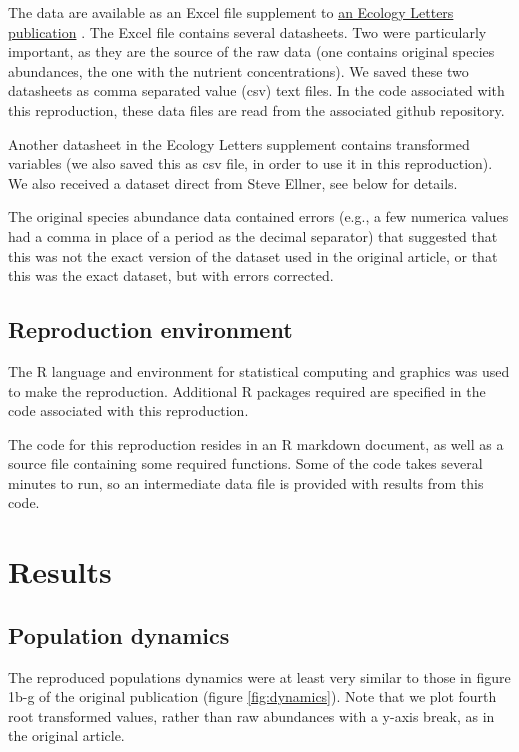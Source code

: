 \documentclass[10pt,a4paper,onecolumn]{article}
\begin{document}
The data are available as an Excel file supplement to
\href{http://onlinelibrary.wiley.com/doi/10.1111/j.1461-0248.2009.01391.x/abstract}{an
Ecology Letters publication} \textcite{Beninca2009}. The Excel file
contains several datasheets. Two were particularly important, as they
are the source of the raw data (one contains original species
abundances, the one with the nutrient concentrations). We saved these
two datasheets as comma separated value (csv) text files. In the code
associated with this reproduction, these data files are read from the
associated github repository.

Another datasheet in the Ecology Letters supplement contains transformed
variables (we also saved this as csv file, in order to use it in this
reproduction). We also received a dataset direct from Steve Ellner, see
below for details.

The original species abundance data contained errors (e.g., a few
numerica values had a comma in place of a period as the decimal
separator) that suggested that this was not the exact version of the
dataset used in the original article, or that this was the exact
dataset, but with errors corrected.

\subsection{Reproduction environment}\label{reproduction-environment}

The R language and environment for statistical computing and graphics
was used to make the reproduction. Additional R packages required are
specified in the code associated with this reproduction.

The code for this reproduction resides in an R markdown document, as
well as a source file containing some required functions. Some of the
code takes several minutes to run, so an intermediate data file is
provided with results from this code.

\section{Results}\label{results}

\subsection{Population dynamics}\label{population-dynamics}

The reproduced populations dynamics were at least very similar to those
in figure 1b-g of the original publication (figure \ref{fig:dynamics}).
Note that we plot fourth root transformed values, rather than raw
abundances with a y-axis break, as in the original article.
\end{document}
